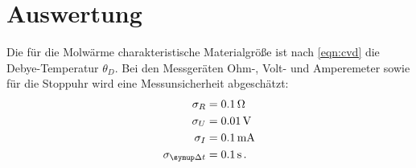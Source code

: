 \section{Auswertung}
\label{sec:Auswertung}
Die für die Molwärme charakteristische Materialgröße ist nach \eqref{eqn:cvd} die Debye-Temperatur $\theta_D$. 
Bei den Messgeräten Ohm-, Volt- und Amperemeter sowie für die Stoppuhr wird eine Messunsicherheit abgeschätzt:
\begin{align*}
	\sigma_R &= \SI{0.1}{\ohm}\\
	\sigma_U &= \SI{0.01}{\volt}\\
	\sigma_I &= \SI{0.1}{\milli\ampere}\\
	\sigma_{\symup\Delta t} &= \SI{0.1}{\second}	\,\text.
\end{align*}
